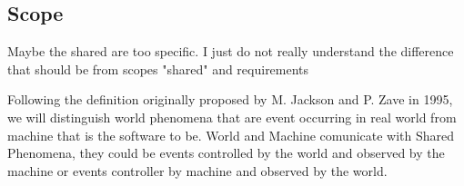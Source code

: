 \documentclass[a4paper, 10pt, oneside]{article}
\newcommand*{\lorenzo}[1]{\textcolor{BurntOrange}{#1}}
\begin{document}
\pagebreak

\subsection{Scope}
\lorenzo{Maybe the shared are too specific. I just do not really understand the difference that should be from scopes "shared" and requirements}

\begin{flushleft}
Following the definition originally proposed by M. Jackson and P. Zave in 1995,
we will distinguish world phenomena that are event occurring in real world from machine
that is the software to be.
World and Machine comunicate with Shared Phenomena, they could be events controlled by the world and observed by the machine or events controller by machine and observed by the world.
\end{flushleft}
\end{document}
